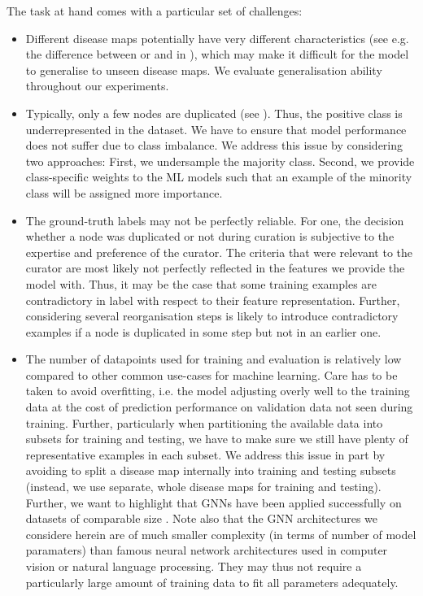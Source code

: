 \documentclass[
	fontsize=10pt, %
	twoside=false, %
	secnumdepth=1, %
  toc=indentunnumbered %
]{kaobook}
\begin{document}
The task at hand comes with a particular set of challenges:
\begin{itemize}
\item Different disease maps potentially have very different characteristics
  (see e.g. the difference between \ADMap{} or \PDMap{} and \ReconMap in
  ), which may make it difficult for the model to
  generalise to unseen disease maps. We evaluate generalisation ability
  throughout our experiments.
\item Typically, only a few nodes are duplicated (see ).
  Thus, the positive class is underrepresented in the dataset. We have to ensure that
  model performance does not suffer due to class imbalance. We address this
  issue by considering two approaches: First, we undersample the majority class.
  Second, we provide class-specific weights to the ML models such that an
  example of the minority class will be assigned more importance.
\item The ground-truth labels may not be perfectly reliable.
  For one, the decision whether a node was duplicated or not during curation is
  subjective to the expertise and preference of the curator. The criteria that
  were relevant to the curator are most likely not perfectly reflected in the
  features we provide the model with.
  Thus, it may be the case that some
  training examples are contradictory in label with respect to their feature
  representation. Further, considering several reorganisation steps is likely to
  introduce contradictory examples if a node is duplicated in some step but not
  in an earlier one.
\item The number of datapoints used for training and evaluation is relatively
  low compared to other common use-cases for machine learning. Care has to be
  taken to avoid overfitting, i.e. the model adjusting overly well to the training
  data at the cost of prediction performance on validation data not seen during
  training. Further, particularly when partitioning the available data into
  subsets for training and testing, we have to make sure we still have plenty of
  representative examples in each subset. We address this issue in part by avoiding to
  split a disease map internally into training and testing subsets (instead, we
  use separate, whole disease maps for training and testing). Further, we
  want to highlight that GNNs have been applied successfully on datasets
  of comparable size \cite{schulte-sasse_IntegrationMultiomicsData_2021}.
  Note also that the GNN architectures we considere herein are of
  much smaller complexity (in terms of number of model paramaters) than famous
  neural network architectures used in computer vision or natural language
  processing. They may thus not require a particularly large amount of training
  data to fit all parameters adequately.
\end{itemize}
\end{document}
